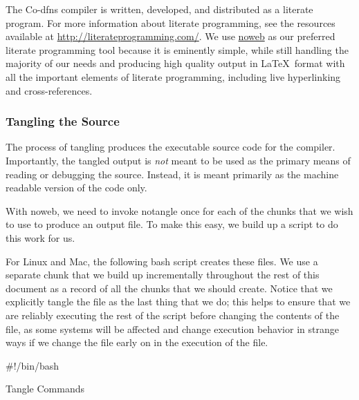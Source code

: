 \documentclass{article}%
\begin{document}
The Co-dfns compiler is written, developed, and distributed as a
literate program.
For more information about literate programming,
see the resources available at \url{http://literateprogramming.com/}.
We use \href{https://www.cs.tufts.edu/~nr/noweb/}{noweb} as our
preferred literate programming tool because it is eminently simple,
while still handling the majority of our needs and producing high
quality output in \LaTeX\ format with all the important elements of
literate programming, including live hyperlinking and cross-references.

\subsubsection{Tangling the Source}

The process of tangling produces the executable source code 
for the compiler.
Importantly, the tangled output is \emph{not} meant to be used 
as the primary means of reading or debugging the source.
Instead, it is meant primarily as the machine readable version
of the code only.

With noweb, we need to invoke {\Tt{}notangle\nwendquote} once for each of the 
chunks that we wish to use to produce an output file.
To make this easy, we build up a script to do this work for us.

For Linux and Mac, the following bash script creates these files. 
We use a separate chunk that we build up incrementally 
throughout the rest of this document as a record of all the chunks
that we should create.
Notice that we explicitly tangle the {\Tt{}\nwendquote} file as the last
thing that we do;
this helps to ensure that we are reliably executing the rest of the 
script before changing the contents of the file,
as some systems will be affected and change execution behavior 
in strange ways if we change the {\Tt{}\nwendquote} file early on in the 
execution of the file.

\nwenddocs{}\endmoddef\nwstartdeflinemarkup\nwenddeflinemarkup
#!/bin/bash

\LA{}Tangle Commands~{\nwtagstyle{}}\RA{}
\end{document}
